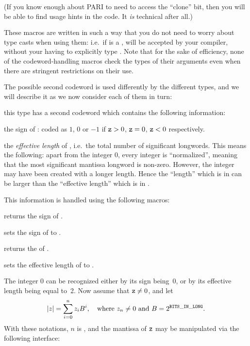 \noindent
(If you know enough about PARI to need to access the ``clone'' bit, then
you will be able to find usage hints in the code. It \emph{is} technical after
all.)

These macros are written in such a way that you do not need to worry about
type casts when using them: i.e.~if  is a , 
will be accepted by your compiler, without your having to explicitly type
. Note that for the sake of efficiency, none of the
codeword-handling macros check the types of their arguments even when there
are stringent restrictions on their use.

The possible second codeword is used differently by the different types, and
we will describe it as we now consider each of them in turn:


 this type has
a second codeword  which contains the following information:

the sign of : coded as $1$, $0$ or $-1$ if ${\tt z} > 0$, ${\tt z} = 0$,
${\tt z} < 0$ respectively.

the \emph{effective length} of , i.e.~the total number of significant
longwords. This means the following: apart from the integer 0, every integer
is ``normalized'', meaning that the most significant mantissa longword is
non-zero. However, the integer may have been created with a longer length.
Hence the ``length'' which is in  can be larger than the
``effective length'' which is in .

\noindent This information is handled using the following macros:

 returns the sign of .

 sets the sign of  to .

 returns the  of .

 sets the effective length
of  to .

The integer 0 can be recognized either by its sign being~0, or by its
effective length being equal to~2. Now assume that ${\tt z} \ne 0$, and let
$$ |z| = \sum_{i = 0}^n z_i B^i,
  \quad{\rm where}~z_n\ne 0~{\rm and}~B = 2^{{\tt BITS\_IN\_LONG}}.
$$
With these notations, $n$ is , and the mantissa of
${\tt z}$ may be manipulated via the following interface:

